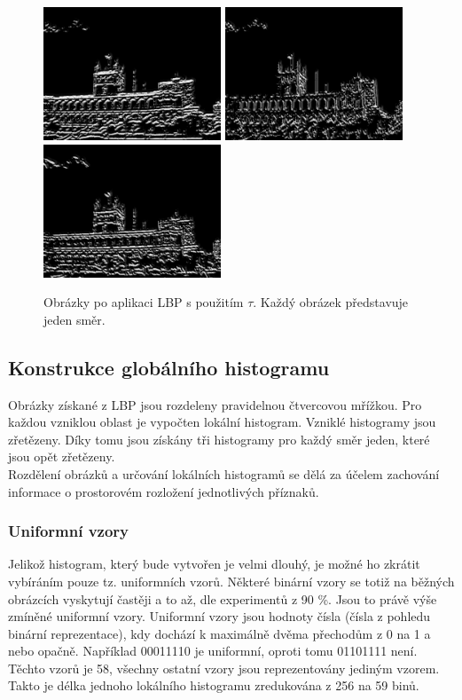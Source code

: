 \documentclass[czech,BP]{thesiskiv}
\begin{document}
\begin{figure}[ht]
	\centering
	\includegraphics[width=150pt]{./img/lbp1_tau.jpg}
	\includegraphics[width=150pt]{./img/lbp2_tau.jpg}
	\includegraphics[width=150pt]{./img/lbp3_tau.jpg}
	\caption{Obrázky po aplikaci LBP s použitím $\tau$. Každý obrázek představuje jeden směr.}
\end{figure}

\subsection{Konstrukce globálního histogramu}
\par Obrázky získané z LBP jsou rozdeleny pravidelnou čtvercovou mřížkou. Pro každou vzniklou oblast je vypočten lokální histogram. Vzniklé histogramy jsou zřetězeny. Díky tomu jsou získány tři histogramy pro každý směr jeden, které jsou opět zřetězeny. \\
Rozdělení obrázků a určování lokálních histogramů se dělá za účelem zachování informace o prostorovém rozložení jednotlivých příznaků.

\subsubsection{Uniformní vzory}
Jelikož histogram, který bude vytvořen je velmi dlouhý, je možné ho zkrátit vybíráním pouze tz. uniformních vzorů. Některé binární vzory se totiž na běžných obrázcích vyskytují častěji a to až, dle experimentů z 90 \%. Jsou to právě výše zmíněné uniformní vzory. Uniformní vzory jsou hodnoty čísla (čísla z pohledu binární reprezentace), kdy dochází k maximálně dvěma přechodům z 0 na 1 a nebo opačně. Například 00011110 je uniformní, oproti tomu 01101111 není. Těchto vzorů je 58, všechny ostatní vzory jsou reprezentovány jediným vzorem. Takto je délka jednoho lokálního histogramu zredukována z 256 na 59 binů.
\end{document}
